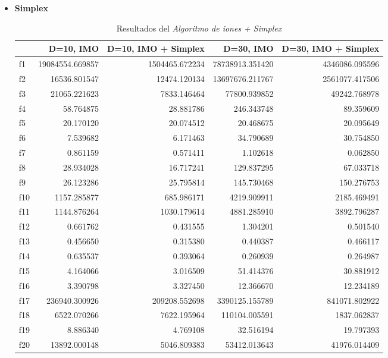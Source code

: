 \documentclass[a4paper,11pt]{article}
\begin{document}
\begin{itemize}
\begin{itemize}
  
  \item \textbf{Simplex}
  \begin{table}[H]	
  \caption{Resultados del \textit{Algoritmo de iones + Simplex}}
  \centering
  \begin{tabular}{|l|r|r|||r|r|}
  \hline
  & \textbf{D=10, IMO} & \textbf{D=10, IMO + Simplex} & \textbf{D=30, IMO} & \textbf{D=30, IMO + Simplex}\\ \hline
  f1 &  19084554.669857 &  1504465.672234 &  78738913.351420 &  4346086.095596 \\ \hline
  f2 &  16536.801547 &  12474.120134 &  13697676.211767 &  2561077.417506 \\ \hline
  f3 &  21065.221623 &  7833.146464 &  77800.939852 &  49242.768978 \\ \hline
  f4 &  58.764875 &  28.881786 &  246.343748 &  89.359609 \\ \hline
  f5 &  20.170120 &  20.074512 &  20.468675 &  20.095649 \\ \hline
  f6 &  7.539682 &  6.171463 &  34.790689 &  30.754850 \\ \hline
  f7 &  0.861159 &  0.571411 &  1.102618 &  0.062850 \\ \hline
  f8 &  28.934028 &  16.717241 &  129.837295 &  67.033718 \\ \hline
  f9 &  26.123286 &  25.795814 &  145.730468 &  150.276753 \\ \hline
  f10 &  1157.285877 &  685.986171 &  4219.909911 &  2185.469491 \\ \hline
  f11 &  1144.876264 &  1030.179614 &  4881.285910 &  3892.796287 \\ \hline
  f12 &  0.661762 &  0.431555 &  1.304201 &  0.501540 \\ \hline
  f13 &  0.456650 &  0.315380 &  0.440387 &  0.466117 \\ \hline
  f14 &  0.635537 &  0.393064 &  0.260939 &  0.264987 \\ \hline
  f15 &  4.164066 &  3.016509 &  51.414376 &  30.881912 \\ \hline
  f16 &  3.390798 &  3.327450 &  12.366670 &  12.234189 \\ \hline
  f17 &  236940.300926 &  209208.552698 &  3390125.155789 &  841071.802922 \\ \hline
  f18 &  6522.070266 &  7622.195964 &  110104.005591 &  1837.062837 \\ \hline
  f19 &  8.886340 &  4.769108 &  32.516194 &  19.797393 \\ \hline
  f20 &  13892.000148 &  5046.809383 &  53412.013643 &  41976.014409 \\ \hline
  \end{tabular}
  \end{table}
  

\end{itemize}
\end{itemize}
\end{document}
